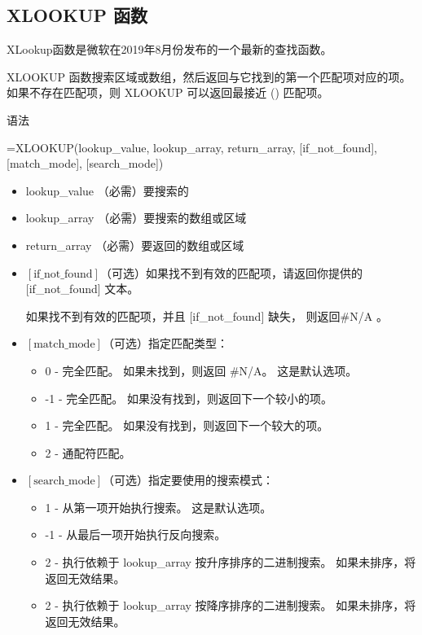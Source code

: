\subsection{XLOOKUP 函数}

XLookup函数是微软在2019年8月份发布的一个最新的查找函数。

XLOOKUP 函数搜索区域或数组，然后返回与它找到的第一个匹配项对应的项。 如果不存在匹配项，则 XLOOKUP 可以返回最接近 () 匹配项。

语法

=XLOOKUP(lookup\_value, lookup\_array, return\_array, [if\_not\_found], [match\_mode], [search\_mode]) 

\begin{itemize}
    \item lookup\_value （必需）要搜索的
    \item lookup\_array （必需）要搜索的数组或区域
    \item return\_array （必需）要返回的数组或区域
    \item $[\mathrm{if\_not\_found}]$（可选）如果找不到有效的匹配项，请返回你提供的 [if\_not\_found] 文本。
    
    如果找不到有效的匹配项，并且 [if\_not\_found] 缺失， 则返回\#N/A 。
    \item $[\mathrm{match\_mode}]$（可选）指定匹配类型：
        \begin{itemize}
            \item 0 - 完全匹配。 如果未找到，则返回 \#N/A。 这是默认选项。
            \item -1 - 完全匹配。 如果没有找到，则返回下一个较小的项。
            \item 1 - 完全匹配。 如果没有找到，则返回下一个较大的项。
            \item 2 - 通配符匹配。
        \end{itemize} 
    \item $[\mathrm{search\_mode}]$（可选）指定要使用的搜索模式：
        \begin{itemize}
            \item 1 - 从第一项开始执行搜索。 这是默认选项。
            \item -1 - 从最后一项开始执行反向搜索。
            \item 2 - 执行依赖于 lookup\_array 按升序排序的二进制搜索。 如果未排序，将返回无效结果。
            \item 2 - 执行依赖于 lookup\_array 按降序排序的二进制搜索。 如果未排序，将返回无效结果。
        \end{itemize} 
\end{itemize}

